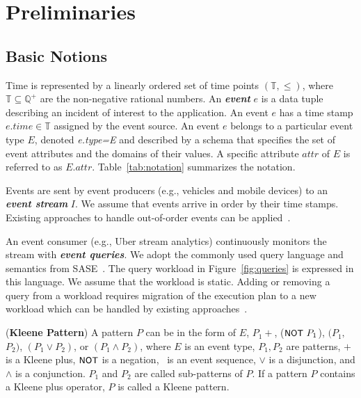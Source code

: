 \section{Preliminaries}
\label{sec:basic}

\subsection{Basic Notions}
\label{sec:basic_notions}

Time is represented by a linearly ordered set of time points $(\mathbb{T},\leq)$, where $\mathbb{T} \subseteq \mathbb{Q^+}$ are the non-negative rational numbers. 
%
An \textbf{\textit{event}} $e$ is a data tuple describing an incident of interest to the application. An event $e$ has a time stamp $e.time \in \mathbb{T}$ assigned by the event source. 
An event $e$ belongs to a particular event type $E$, denoted \textit{e.type=E} and described by a schema that specifies the set of event attributes and the domains of their values. A specific attribute $\mathit{attr}$ of $E$ is referred to as $E.\mathit{attr}$.
Table~\ref{tab:notation} summarizes the notation.

Events are sent by event producers (e.g., vehicles and mobile devices) to an  \textbf{\textit{event stream}} $I$. We assume that events arrive in order by their time stamps. Existing approaches to handle out-of-order events can be applied~\cite{CGM10, LTSPJM08, LLGRC09, SW04}.

An event consumer (e.g., Uber stream analytics) continuously monitors the stream with \textbf{\textit{event queries}}. We adopt the commonly used query language and semantics from SASE~\cite{ADGI08, WDR06, ZDI14}.
The query workload in Figure~\ref{fig:queries} is expressed in this language. We assume that the workload is static. Adding or removing a query from a workload requires migration of the execution plan to a new workload which can be handled by existing approaches~\cite{KWF06, ZhuRH04}.






\begin{definition}(\textbf{Kleene Pattern})
%
A pattern $P$ can be in the form of 
$E$, $P_1+$, (${\small \textsf{NOT}}\ P_1$),
\seq$(P_1,$ $P_2)$, $(P_1 \vee P_2)$, or $(P_1 \wedge P_2)$, 
where 
$E$ is an event type,
$P_1,P_2$ are patterns, 
$+$ is a Kleene plus, 
${\small \textsf{NOT}}$ is a negation,
\seq\ is an event sequence,
$\vee$ is a disjunction, and
$\wedge$ is a conjunction.
%
$P_1$ and $P_2$ are called sub-patterns of $P$.
%
If a pattern $P$ contains a Kleene plus operator, $P$ is called a Kleene pattern.
%
\label{def:pattern}
\end{definition}

